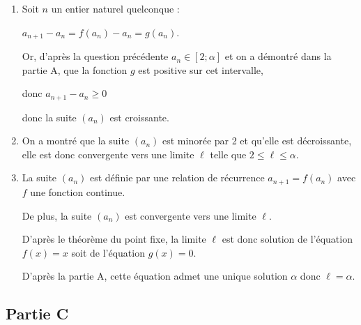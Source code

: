 \documentclass[10pt]{article}
\begin{document}
\begin{enumerate}
	\item  Soit $n$ un entier naturel quelconque :

	$a_{n+1}-a_n= f\left(a_n\right)-a_n = g\left(a_n\right)$.

	Or, d'après la question précédente $a_n \in [2; \alpha]$ et  on a démontré dans la partie A, que la fonction $g$ est positive sur cet intervalle,

	donc $a_{n+1}-a_n\geqslant 0$

	donc la suite $(a_{n})$ est croissante.

	\item  On a montré que la suite $(a_{n})$  est minorée par 2 et qu'elle est décroissante, elle est donc convergente vers une limite $\ell$ telle que $2 \leqslant\ell \leqslant \alpha$.

	\item La suite $(a_{n})$ est définie par une relation de récurrence $a_{n+1}=f(a_n)$ avec $f$ une fonction continue.

	De plus, la suite $(a_{n})$ est convergente vers une limite $\ell$.

	D'après le théorème du point fixe, la limite $\ell$ est donc solution de l'équation $f(x)=x$ soit de l'équation $g(x)=0$.

	D'après la partie A, cette équation admet une unique solution $\alpha$ donc $\ell = \alpha$.

\end{enumerate}

\subsection*{Partie C}
\end{document}

